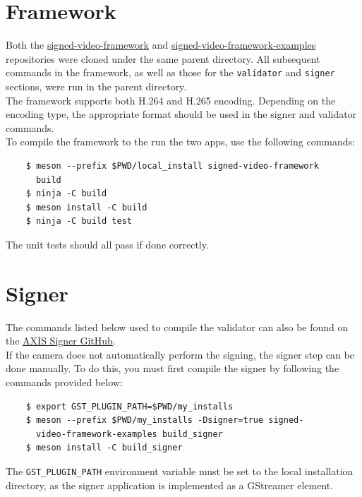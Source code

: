 \documentclass[a4paper,12pt]{article}
\begin{document}
\section{Framework}
Both the \href{https://github.com/AxisCommunications/signed-video-framework}{signed-video-framework} and \href{https://github.com/AxisCommunications/signed-video-framework-examples}{signed-video-framework-examples} repositories were cloned under the same parent directory. All subsequent commands in the framework, as well as those for the \texttt{validator} and \texttt{signer} sections, were run in the parent directory. \\

The framework supports both H.264 and H.265 encoding. Depending on the encoding type, the appropriate format should be used in the signer and validator commands. \\

To compile the framework to the run the two apps, use the following commands:

\begin{verbatim}
    $ meson --prefix $PWD/local_install signed-video-framework 
      build
    $ ninja -C build
    $ meson install -C build 
    $ ninja -C build test 
\end{verbatim}

The unit tests should all pass if done correctly.

\section{Signer}
The commands listed below used to compile the validator can also be found on the \href{https://github.com/AxisCommunications/signed-video-framework-examples/tree/master/apps/signer}{AXIS Signer GitHub}. \\

If the camera does not automatically perform the signing, the signer step can be done manually. To do this, you must first compile the signer by following the commands provided below:

\begin{verbatim}
    $ export GST_PLUGIN_PATH=$PWD/my_installs
    $ meson --prefix $PWD/my_installs -Dsigner=true signed-
      video-framework-examples build_signer 
    $ meson install -C build_signer
\end{verbatim}

The \texttt{GST\_PLUGIN\_PATH} environment variable must be set to the local installation directory, as the signer application is implemented as a GStreamer element. \\
\end{document}
